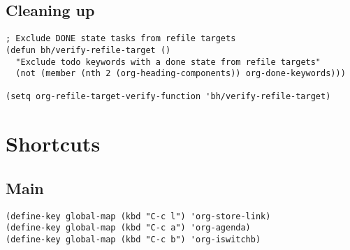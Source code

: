 \documentclass[11pt]{scrartcl}
\begin{document}
\subsection{Cleaning up}
\label{sec:orgheadline44}
\begin{verbatim}
; Exclude DONE state tasks from refile targets
(defun bh/verify-refile-target ()
  "Exclude todo keywords with a done state from refile targets"
  (not (member (nth 2 (org-heading-components)) org-done-keywords)))

(setq org-refile-target-verify-function 'bh/verify-refile-target)
\end{verbatim}
\section{Shortcuts}
\label{sec:orgheadline50}

\subsection{Main}
\label{sec:orgheadline46}

\begin{verbatim}
(define-key global-map (kbd "C-c l") 'org-store-link)
(define-key global-map (kbd "C-c a") 'org-agenda)
(define-key global-map (kbd "C-c b") 'org-iswitchb)
\end{verbatim}
\end{document}
